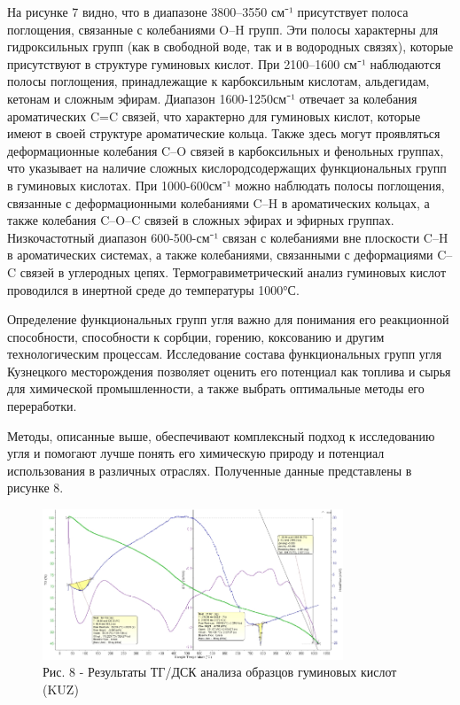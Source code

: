 \begin{multicols}{2}
На рисунке 7 видно, что в диапазоне 3800--3550 см⁻¹ присутствует полоса
поглощения, связанные с колебаниями O--H групп. Эти полосы характерны
для гидроксильных групп (как в свободной воде, так и в водородных
связях), которые присутствуют в структуре гуминовых кислот. При
2100--1600 см⁻¹ наблюдаются полосы поглощения, принадлежащие к
карбоксильным кислотам, альдегидам, кетонам и сложным эфирам. Диапазон
1600-1250см⁻¹ отвечает за колебания ароматических C=C связей, что
характерно для гуминовых кислот, которые имеют в своей структуре
ароматические кольца. Также здесь могут проявляться деформационные
колебания C--O связей в карбоксильных и фенольных группах, что указывает
на наличие сложных кислородсодержащих функциональных групп в гуминовых
кислотах. При 1000-600см⁻¹ можно наблюдать полосы поглощения, связанные
с деформационными колебаниями C--H в ароматических кольцах, а также
колебания C--O--C связей в сложных эфирах и эфирных группах.
Низкочастотный диапазон 600-500-см⁻¹ связан с колебаниями вне плоскости
C--H в ароматических системах, а также колебаниями, связанными с
деформациями C--C связей в углеродных цепях. Термогравиметрический
анализ гуминовых кислот проводился в инертной среде до температуры
1000°С.

Определение функциональных групп угля важно для понимания его
реакционной способности, способности к сорбции, горению, коксованию и
другим технологическим процессам. Исследование состава функциональных
групп угля Кузнецкого месторождения позволяет оценить его потенциал как
топлива и сырья для химической промышленности, а также выбрать
оптимальные методы его переработки.

Методы, описанные выше, обеспечивают комплексный подход к исследованию
угля и помогают лучше понять его химическую природу и потенциал
использования в различных отраслях. Полученные данные представлены в
рисунке 8.
\end{multicols}

\begin{figure}[H]
	\centering
	\includegraphics[width=0.8\textwidth]{media/gorn3/image19}
	\caption*{Рис. 8 - Результаты ТГ/ДСК анализа образцов гуминовых кислот (KUZ)}
\end{figure}


